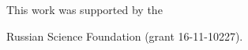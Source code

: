 




\vspace*{-16pt}





\Ack


\noindent


This work was supported by the


Russian Science Foundation (grant 16-11-10227).











\vspace*{1pt}





